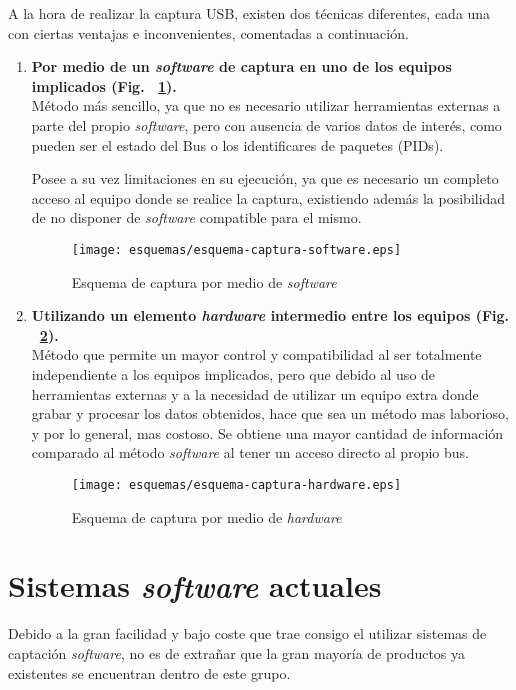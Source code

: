 A la hora de realizar la captura USB, existen dos técnicas diferentes, cada una con ciertas ventajas e inconvenientes, comentadas a continuación.
\begin{enumerate}
    \item \textbf{Por medio de un \textit{software} de captura en uno de los equipos implicados (Fig. ~\ref{fig:captura-SW}).} \\
    Método más sencillo, ya que no es necesario utilizar herramientas externas a parte del propio \textit{software}, pero con ausencia de varios datos de interés, como pueden ser el estado del Bus o los identificares de paquetes (PIDs).
    
    Posee a su vez limitaciones en su ejecución, ya que es necesario un completo acceso al equipo donde se realice la captura, existiendo además la posibilidad de no disponer de \textit{software} compatible para el mismo. 
    \begin{figure}[hbtp]
        \centering
        \texttt{[image: esquemas/esquema-captura-software.eps]}
        \caption{Esquema de captura por medio de \textit{software}}
        \label{fig:captura-SW}
    \end{figure}
    
    \item \textbf{Utilizando un elemento \textit{hardware} intermedio entre los equipos (Fig. ~\ref{fig:captura-HW}).} \\
    Método que permite un mayor control y compatibilidad al ser totalmente independiente a los equipos implicados, pero que debido al uso de herramientas externas y a la necesidad de utilizar un equipo extra donde grabar y procesar los datos obtenidos, hace que sea un método mas laborioso, y por lo general, mas costoso.
    Se obtiene una mayor cantidad de información comparado al método \textit{software} al tener un acceso directo al propio bus.
    \begin{figure}[hbtp]
        \centering
        \texttt{[image: esquemas/esquema-captura-hardware.eps]}
        \caption{Esquema de captura por medio de \textit{hardware}}
        \label{fig:captura-HW}
    \end{figure}
\end{enumerate}

\section{Sistemas \emph{software} actuales}
Debido a la gran facilidad y bajo coste que trae consigo el utilizar sistemas de captación \emph{software}, no es de extrañar que la gran mayoría de productos ya existentes se encuentran dentro de este grupo.

